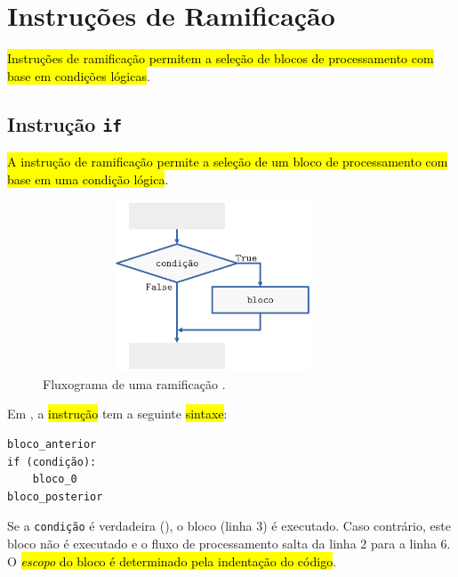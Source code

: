 \section{Instruções de Ramificação}\label{cap_progest_sec_ramifica}

\hl{Instruções de ramificação permitem a seleção de blocos de processamento com base em condições lógicas}.

\subsection{Instrução \texttt{if}}

\hl{A instrução de ramificação {\PYTHONif} permite a seleção de um bloco de processamento com base em uma condição lógica}.

\begin{figure}[H]
  \centering
  \includegraphics[max width=0.9\textwidth, max height=2in]{./cap_progest/dados/fig_fg_if/fig.png}
  \caption{Fluxograma de uma ramificação {\PYTHONif}.}
  \label{cap_progest_sec_ramifica:fig:fg_if}
\end{figure}

Em {\python}, a \hl{instrução {\PYTHONif}} tem a seguinte \hl{sintaxe}:

\begin{lstlisting}
bloco_anterior
if (condição):
    bloco_0
bloco_posterior
\end{lstlisting}

Se a {\lstinline+condição+} é verdadeira ({\PYTHONTrue}), o bloco (linha 3) é executado. Caso contrário, este bloco não é executado e o fluxo de processamento salta da linha 2 para a linha 6. O \hl{\emph{escopo} do bloco {\PYTHONif} é determinado pela indentação do código}.

